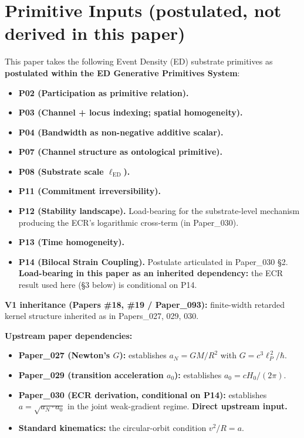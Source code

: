 \documentclass[11pt,a4paper]{article}
\begin{document}
\section{Primitive Inputs (postulated, not derived in this paper)}

This paper takes the following Event Density (ED) substrate primitives as \textbf{postulated within the ED Generative Primitives System}:

\begin{itemize}[noitemsep]
\item \textbf{P02 (Participation as primitive relation).}
\item \textbf{P03 (Channel + locus indexing; spatial homogeneity).}
\item \textbf{P04 (Bandwidth as non-negative additive scalar).}
\item \textbf{P07 (Channel structure as ontological primitive).}
\item \textbf{P08 (Substrate scale $\ell_\mathrm{ED}$).}
\item \textbf{P11 (Commitment irreversibility).}
\item \textbf{P12 (Stability landscape).} Load-bearing for the substrate-level mechanism producing the ECR's logarithmic cross-term (in Paper\_030).
\item \textbf{P13 (Time homogeneity).}
\item \textbf{P14 (Bilocal Strain Coupling).} Postulate articulated in Paper\_030 \S2. \textbf{Load-bearing in this paper as an inherited dependency:} the ECR result used here (\S3 below) is conditional on P14.
\end{itemize}

\textbf{V1 inheritance (Papers \#18, \#19 / Paper\_093):} finite-width retarded kernel structure inherited as in Papers\_027, 029, 030.

\textbf{Upstream paper dependencies:}

\begin{itemize}[noitemsep]
\item \textbf{Paper\_027 (Newton's $G$):} establishes $a_N = GM/R^2$ with $G = c^3\ell_P^{\,2}/\hbar$.
\item \textbf{Paper\_029 (transition acceleration $a_0$):} establishes $a_0 = cH_0/(2\pi)$.
\item \textbf{Paper\_030 (ECR derivation, conditional on P14):} establishes $a = \sqrt{a_N \cdot a_0}$ in the joint weak-gradient regime. \textbf{Direct upstream input.}
\item \textbf{Standard kinematics:} the circular-orbit condition $v^2/R = a$.
\end{itemize}
\end{document}
